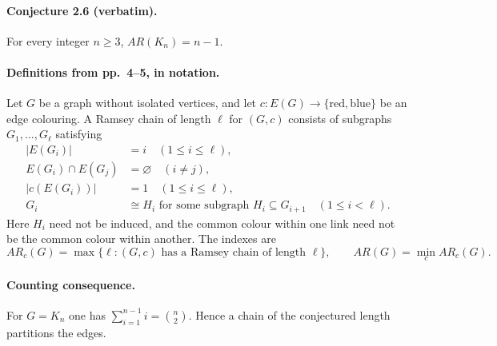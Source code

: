 \documentclass{article}
\begin{document}
\paragraph{Conjecture 2.6 (verbatim).}
For every integer $n \ge 3$, $AR(K_n) = n-1$.

\paragraph{Definitions from pp.\ 4--5, in notation.}
Let $G$ be a graph without isolated vertices, and let
$c:E(G)\to\{\mathrm{red},\mathrm{blue}\}$ be an edge colouring.
A Ramsey chain of length $\ell$ for $(G,c)$ consists of subgraphs
$G_1,\ldots,G_\ell$ satisfying
\begin{align*}
  |E(G_i)| &= i \quad (1\le i\le\ell),\\
  E(G_i)\cap E(G_j) &= \varnothing \quad (i\ne j),\\
  |c(E(G_i))| &= 1 \quad (1\le i\le\ell),\\
  G_i &\cong H_i\text{ for some subgraph }H_i\subseteq G_{i+1}
       \quad (1\le i<\ell).
\end{align*}
Here $H_i$ need not be induced, and the common colour within one link
need not be the common colour within another. The indexes are
\[
 AR_c(G)=\max\{\ell:(G,c)\text{ has a Ramsey chain of length }\ell\},
 \qquad AR(G)=\min_c AR_c(G).
\]

\paragraph{Counting consequence.}
For $G=K_n$ one has $\sum_{i=1}^{n-1}i=\binom n2$. Hence a chain of the
conjectured length partitions the edges.
\end{document}
